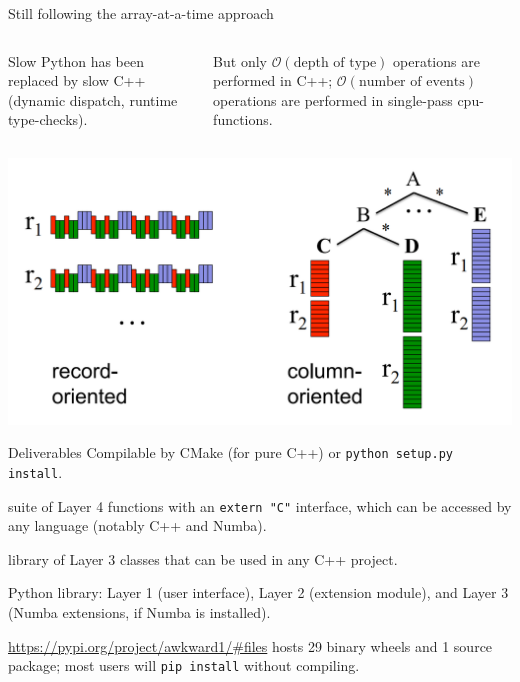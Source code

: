 \documentclass[aspectratio=169]{beamer}
\begin{document}
\begin{frame}{Still following the array-at-a-time approach}
\large
\vspace{1 cm}
\begin{columns}
Slow Python has been replaced by slow C++ (dynamic dispatch, runtime type-checks).

\vspace{0.75 cm}
But only $\mathcal{O}(\mbox{depth of type})$ operations are performed in C++; $\mathcal{O}(\mbox{number of events})$ operations are performed in single-pass cpu-functions.
\end{columns}

\begin{center}
\includegraphics[width=0.5\linewidth]{google-dremel-fig1.png}
\end{center}
\end{frame}

\begin{frame}{Deliverables}
\large
\vspace{0.75 cm}
Compilable by CMake (for pure C++) or \texttt{python setup.py install}.

\vspace{0.5 cm}
\begin{description}\setlength{\itemsep}{0.5 cm}
\item[cpu-kernels.so] suite of Layer 4 functions with an \texttt{extern "C"} interface, which can be accessed by any language (notably C++ and Numba).

\item[libawkward.so] library of Layer 3 classes that can be used in any C++ project.

\item[\hspace{0.75 cm}awkward1] Python library: Layer 1 (user interface), Layer 2 (extension module), and Layer 3 (Numba extensions, if Numba is installed).
\end{description}

\vspace{0.75 cm}
\textcolor{blue}{\normalsize \url{https://pypi.org/project/awkward1/\#files}} hosts 29 binary wheels and 1 source package; most users will \texttt{pip install} without compiling.
\end{frame}
\end{document}
